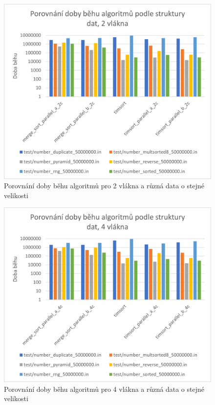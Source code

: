 \documentclass[thesis=B,czech]{FITthesis}[2019/12/23]
\begin{document}
\begin{figure}[htbp]\centering
	\includegraphics[width=13cm]{obrazky/graf28.png}
	\caption[Porovnání doby běhu algoritmů pro 2 vlákna a různá data o stejné velikosti]{Porovnání doby běhu algoritmů pro 2 vlákna a různá data o stejné velikosti}\label{fig:graf28}
\end{figure}

\begin{figure}[htbp]\centering
	\includegraphics[width=13cm]{obrazky/graf29.png}
	\caption[Porovnání doby běhu algoritmů pro 4 vlákna a různá data o stejné velikosti]{Porovnání doby běhu algoritmů pro 4 vlákna a různá data o stejné velikosti}\label{fig:graf29}
\end{figure}
\end{document}
